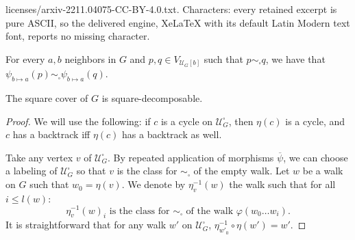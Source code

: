 \documentclass[10pt,a4paper]{amsart}
\newcommand\quadcover[1]{\mathcal{U}^\square_{#1}}
\begin{document}
licenses/arxiv-2211.04075-CC-BY-4.0.txt. Characters: every retained excerpt is pure ASCII, so the delivered engine, XeLaTeX with its default Latin Modern text font, reports no missing character.
\begin{corollary}\label{cor.morphism.quotient}
For every $a, b$ neighbors in $G$ and $p,q \in V_{\mathcal{U}_G[b]}$ such that $p \sim_{\square} q$, we have that $\psi_{b \mapsto a}(p) \sim_{\square} \psi_{b \mapsto a}(q)$.
\end{corollary}

\begin{proposition}\label{proposition.square.cover.decomposable}
The square cover of $G$ is square-decomposable.
\end{proposition}

\begin{proof}
We will use the following: if $c$ is a cycle on $\quadcover{G}$, then $\eta(c)$ is a cycle, and $c$ has a backtrack iff $\eta(c)$ has a backtrack as well.


Take any vertex $v$ of $\quadcover{G}$. By repeated application of morphisms $\overline{\psi}$, we can choose a labeling of $\quadcover{G}$ so that $v$ is the class for $\sim_\square$ of the empty walk.
Let $w$ be a walk on $G$ such that $w_0 = \eta(v)$. We denote by $\eta^{-1}_v(w)$ the walk such that for all $i \le l(w)$:
\[\eta^{-1}_v(w)_i\text{ is the class for }\sim_\square\text{ of the walk } \varphi(w_0\dots w_i).\]
It is straightforward that for any walk $w'$ on $\quadcover{G}$, $\eta^{-1}_{w'_0}\circ\eta(w') = w'$.




\end{proof}
\end{document}
